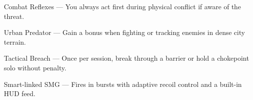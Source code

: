 \begin{WyrdCharacterSheet}
\begin{WyrdStatsBlock}[profile=img/characters/reed_talon]
        \begin{TraitsBox}
            \item[Combat Reflexes] — You always act first during physical conflict if aware of the threat.
            \item[Urban Predator] — Gain a bonus when fighting or tracking enemies in dense city terrain.
            \item[Tactical Breach] — Once per session, break through a barrier or hold a chokepoint solo without penalty.
        \end{TraitsBox}

        \begin{GearBox}
            \item[Smart-linked SMG] — Fires in bursts with adaptive recoil control and a built-in HUD feed.
        \end{GearBox}

        \DamageBox

    \end{WyrdStatsBlock}
\end{WyrdCharacterSheet}


